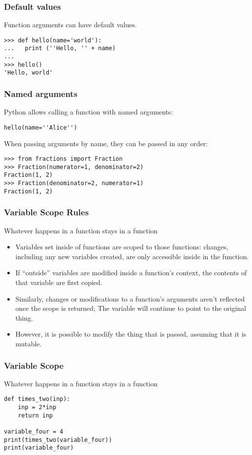 \begin{frame}[fragile]\frametitle{Default values}

  Function arguments can have default values.
\begin{lstlisting}
>>> def hello(name='world'):
...   print (''Hello, '' + name)
...
>>> hello()
'Hello, world'
\end{lstlisting}
\end{frame}

\begin{frame}[fragile]\frametitle{Named arguments}
Python allows calling a function with named arguments:
\begin{lstlisting}
hello(name=''Alice'')
\end{lstlisting}
When passing arguments by name, they can be passed in any order:
\begin{lstlisting}
>>> from fractions import Fraction
>>> Fraction(numerator=1, denominator=2)
Fraction(1, 2)
>>> Fraction(denominator=2, numerator=1)
Fraction(1, 2)
\end{lstlisting}
\end{frame}


\begin{frame}[fragile]\frametitle{Variable Scope Rules}
Whatever happens in a function stays in a function
    \begin{itemize}
    \item Variables set inside of functions are scoped to those functions: changes, including any new variables created, are only accessible inside in the function.
    \item If ``outside'' variables are modified inside a function's context, the contents of that variable are first copied.
	\item Similarly, changes or modifications to a function's arguments aren't reflected once the scope is returned; The variable will continue to point to the original thing. 
	\item However, it is possible to modify the thing that is passed, assuming that it is mutable.
    \end{itemize}
\end{frame}

\begin{frame}[fragile]\frametitle{Variable Scope}
Whatever happens in a function stays in a function
\begin{lstlisting}
def times_two(inp):
    inp = 2*inp
    return inp

variable_four = 4
print(times_two(variable_four))
print(variable_four)
\end{lstlisting}
\end{frame}


